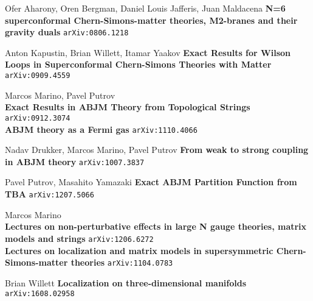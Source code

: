 \documentclass[12pt]{article}
\begin{document}
\begin{thebibliography}{}

\item Ofer Aharony, Oren Bergman, Daniel Louis Jafferis, Juan Maldacena \textbf{N=6 superconformal Chern-Simons-matter theories, M2-branes and their gravity duals} \texttt{arXiv:0806.1218}

\item Anton Kapustin, Brian Willett, Itamar Yaakov \textbf{Exact Results for Wilson Loops in Superconformal Chern-Simons Theories with Matter}  \texttt{arXiv:0909.4559}
\\ 
\item Marcos Marino, Pavel Putrov \\ 
\textbf{Exact Results in ABJM Theory from Topological Strings}  \texttt{arXiv:0912.3074} \\
\textbf{ABJM theory as a Fermi gas} \texttt{arXiv:1110.4066}
\item Nadav Drukker, Marcos Marino, Pavel Putrov \textbf{From weak to strong coupling in ABJM theory} \texttt{arXiv:1007.3837}
\item Pavel Putrov, Masahito Yamazaki \textbf{Exact ABJM Partition Function from TBA} \texttt{arXiv:1207.5066}

\item Marcos Marino \\ 
\textbf{Lectures on non-perturbative effects in large N gauge theories, matrix models and strings} \texttt{arXiv:1206.6272} \\
\textbf{Lectures on localization and matrix models in supersymmetric Chern-Simons-matter theories} \texttt{arXiv:1104.0783}

\item Brian Willett \textbf{Localization on three-dimensional manifolds} \texttt{arXiv:1608.02958}


\end{thebibliography}
\end{document}
